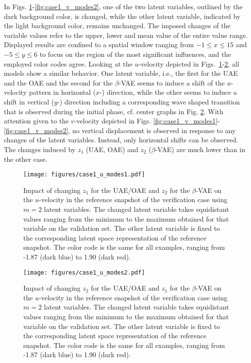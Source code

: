  In Figs. \ref{fig:case1_u_modes1}-\ref{fig:case1_v_modes2}, one of the two latent variables, outlined by the dark background color, is changed, while the other latent variable, indicated by the light background color, remains unchanged.   The imposed changes of the variable values refer to the upper, lower and mean value of the entire value range.
Displayed results are confined to a spatial window ranging from {$-1\le x \le 15$ and $-5\le y\le 6$} to focus on the region of the most significant influences, and
the employed color codes agree.
%
Looking at the $u$-velocity depicted in Figs.~\ref{fig:case1_u_modes1}-\ref{fig:case1_u_modes2}, all models show a similar behavior. One latent variable, i.e., the first for the UAE and the OAE and the second for the $\beta$-VAE seems to induce a shift of the $u$-velocity pattern in horizontal ($x$-) direction, while the other seems to induce a shift in vertical ($y$-) direction including a corresponding wave shaped transition that is observed during the initial phase, cf. center graphs in Fig. \ref{fig:case1_u_modes2}. 
With attention given to the $v$-velocity depicted in Figs. \ref{fig:case1_v_modes1}-\ref{fig:case1_v_modes2}, no vertical displacement is observed in response to any changes of the latent variables. Instead, only horizontal shifts can be observed.
The changes induced by  $z_1$ (UAE, OAE) and $z_2$ ($\beta$-VAE) are much lower than in the other case. 


\begin{figure}[h!]
    \centering
    \texttt{[image: figures/case1\_u\_modes1.pdf]}
    \caption{Impact of  changing $z_1$ for the UAE/OAE and $z_2$ for the $\beta$-VAE on the  $u$-velocity in the reference snapshot of the verification case using $m=2$ latent variables. The changed latent variable takes equidistant values ranging from the minimum to the maximum obtained for that variable on the validation set. The other latent variable is fixed to the corresponding latent space representation of the reference snapshot. The color code is the same for all examples, ranging from -1.87 (dark blue) to 1.90 (dark red).}
    \label{fig:case1_u_modes1}
\end{figure}

\begin{figure}[h!]
    \centering
    \texttt{[image: figures/case1\_u\_modes2.pdf]}
    \caption{Impact of changing $z_2$ for the UAE/OAE and $z_1$ for the $\beta$-VAE on the $u$-velocity in the reference snapshot of the verification case using $m=2$ latent variables. The changed latent variable takes equidistant values ranging from the minimum to the maximum obtained for that variable on the validation set. The other latent variable is fixed to the corresponding latent space representation of the reference snapshot. The color code is the same for all examples, ranging from -1.87 (dark blue) to 1.90 (dark red).}
    \label{fig:case1_u_modes2}
\end{figure}

